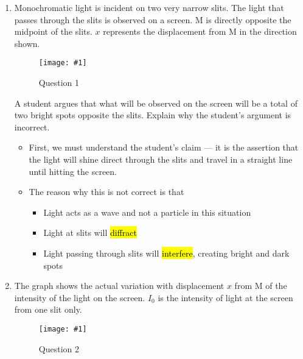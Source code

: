 \documentclass[a4paper,12pt]{article}
\newcommand{\img}[4]{\begin{center}
  \begin{figure}[H]
    \centering
    \texttt{[image: \#1]}
    \caption{#3}
    \label{fig:#4}
  \end{figure}
\end{center}}
\begin{document}
\begin{enumerate}[label=(\alph*)]
  \item Monochromatic light is incident on two very narrow slits. The light that passes through
        the slits is observed on a screen. M is directly opposite the midpoint of the slits.
        $x$ represents the displacement from M in the direction shown.
        \img{ex/1.png}{0.5}{Question 1}{ex1}
        A student argues that what will be observed on the screen will be a total of two bright
        spots opposite the slits. Explain why the student's argument is incorrect.
        \begin{itemize}
          \item First, we must understand the student's claim --- it is the assertion that the light will shine direct through the slits and travel in a straight line until hitting the screen.
          \item The reason why this is not correct is that
                \begin{itemize}
                  \item Light acts as a wave and not a particle in this situation
                  \item Light at slits will \hl{diffract}
                  \item Light passing through slits will \hl{interfere}, creating bright and dark spots
                \end{itemize}
        \end{itemize}
        \pagebreak
  \item The graph shows the actual variation with displacement $x$ from M of the intensity of the light on the screen. $I_0$ is the intensity of light at the screen from one slit only.
        \img{ex/2.png}{0.5}{Question 2}{ex2}


\end{enumerate}
\end{document}
